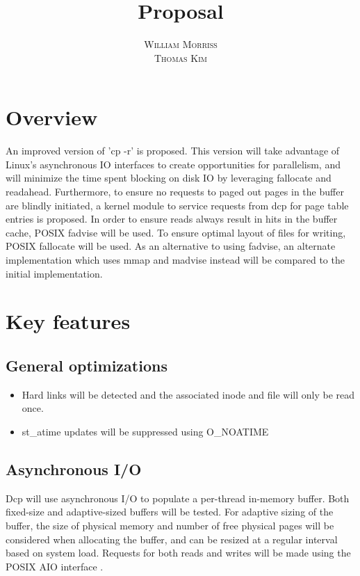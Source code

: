 \documentclass[12pt]{article}
\title{\vspace{-25mm}\fontsize{16pt}{10pt}\selectfont\textbf{Proposal}} %
\author{
  \textsc{William Morriss} \\
  \textsc{Thomas Kim}
}
\date{}
\begin{document}
\maketitle %

\section{Overview}
An improved version of 'cp -r' is proposed.
This version will take advantage of Linux's asynchronous IO interfaces to create
opportunities for parallelism, and will minimize the time spent blocking on disk
IO by leveraging fallocate and readahead. Furthermore, to ensure no requests to
paged out pages in the buffer are blindly initiated, a kernel module to service
requests from dcp for page table entries is proposed. In order to ensure reads
always result in hits in the buffer cache, POSIX fadvise will be used. To ensure optimal
layout of files for writing, POSIX fallocate will be used. As an alternative to
using fadvise, an alternate implementation which uses mmap and madvise instead will
be compared to the initial implementation.

\section{Key features}
\subsection{General optimizations}
\begin{itemize}
    \item Hard links will be detected and the associated inode and file will
          only be read once.
    \item st\_atime updates will be suppressed using O\_NOATIME
\end{itemize}
\subsection{Asynchronous I/O}
Dcp will use asynchronous I/O to populate a per-thread in-memory buffer.
Both fixed-size and adaptive-sized buffers will be tested.
For adaptive sizing of the buffer, the size of physical memory
and number of free physical pages will be considered when allocating
the buffer, and can be resized at a regular interval based on system load.
Requests for both reads and writes will be made using the POSIX AIO interface
\cite{manaio}.
\end{document}
